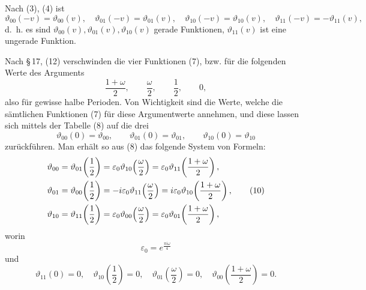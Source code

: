 \documentclass[11pt]{article}
\providecommand{\eps}{\varepsilon}
\providecommand{\eps}{\varepsilon}
\begin{document}
Nach (3), (4) ist
\begin{equation}
\vartheta_{00}(-v)=\vartheta_{00}(v),\quad
\vartheta_{01}(-v)=\vartheta_{01}(v),\quad
\vartheta_{10}(-v)=\vartheta_{10}(v),\quad
\vartheta_{11}(-v)=-\vartheta_{11}(v),
\tag{9}
\end{equation}
d.\ h. es sind $\vartheta_{00}(v),\vartheta_{01}(v),\vartheta_{10}(v)$ gerade Funktionen, $\vartheta_{11}(v)$ ist eine ungerade Funktion.

Nach \S\,17, (12) verschwinden die vier Funktionen (7), bzw. für die folgenden Werte des Arguments
\[
\frac{1+\omega}{2},\qquad \frac{\omega}{2},\qquad \frac12,\qquad 0,
\]
also für gewisse halbe Perioden. Von Wichtigkeit sind die Werte, welche die sämtlichen Funktionen (7) für diese Argumentwerte annehmen, und diese lassen sich mittels der Tabelle (8) auf die drei
\[
\vartheta_{00}(0)=\vartheta_{00},\qquad
\vartheta_{01}(0)=\vartheta_{01},\qquad
\vartheta_{10}(0)=\vartheta_{10}
\]
zurückführen. Man erhält so aus (8) das folgende System von Formeln:
\begin{align}
\vartheta_{00}&=\vartheta_{01}\!\left(\frac12\right)=\eps_0\vartheta_{10}\!\left(\frac{\omega}{2}\right)=\eps_0\vartheta_{11}\!\left(\frac{1+\omega}{2}\right),\notag\\
\vartheta_{01}&=\vartheta_{00}\!\left(\frac12\right)=-i\eps_0\vartheta_{11}\!\left(\frac{\omega}{2}\right)=i\eps_0\vartheta_{10}\!\left(\frac{1+\omega}{2}\right),\tag{10}\\
\vartheta_{10}&=\vartheta_{11}\!\left(\frac12\right)=\eps_0\vartheta_{00}\!\left(\frac{\omega}{2}\right)=\eps_0\vartheta_{01}\!\left(\frac{1+\omega}{2}\right),
\notag
\end{align}
worin
\[
\eps_0=e^{\frac{\pi i\omega}{4}}
\]
und
\begin{equation}
\vartheta_{11}(0)=0,\quad
\vartheta_{10}\!\left(\frac12\right)=0,\quad
\vartheta_{01}\!\left(\frac{\omega}{2}\right)=0,\quad
\vartheta_{00}\!\left(\frac{1+\omega}{2}\right)=0.
\tag{11}
\end{equation}
\end{document}
